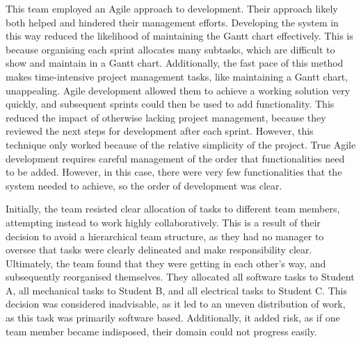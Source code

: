         This team employed an Agile approach to development.
        Their approach likely both helped and hindered their management efforts.
        Developing the system in this way reduced the likelihood of maintaining the Gantt chart effectively.
        This is because organising each sprint allocates many subtasks, which are difficult to show and maintain in a Gantt chart.
        Additionally, the fast pace of this method makes time-intensive project management tasks, like maintaining a Gantt chart, unappealing.
        Agile development allowed them to achieve a working solution very quickly, and subsequent sprints could then be used to add functionality.
        This reduced the impact of otherwise lacking project management, because they reviewed the next steps for development after each sprint.
        However, this technique only worked because of the relative simplicity of the project.
        True Agile development requires careful management of the order that functionalities need to be added.
        However, in this case, there were very few functionalities that the system needed to achieve, so the order of development was clear.

        Initially, the team resisted clear allocation of tasks to different team members, attempting instead to work highly collaboratively.
        This is a result of their decision to avoid a hierarchical team structure, as they had no manager to oversee that tasks were clearly delineated and make responsibility clear.
        Ultimately, the team found that they were getting in each other's way, and subsequently reorganised themselves.
        They allocated all software tasks to Student A, all mechanical tasks to Student B, and all electrical tasks to Student C\@.
        This decision was considered inadvisable, as it led to an uneven distribution of work, as this task was primarily software based.
        Additionally, it added risk, as if one team member became indisposed, their domain could not progress easily.
